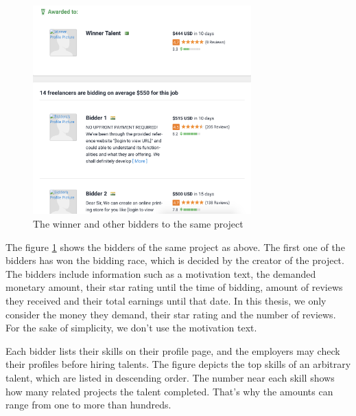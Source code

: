\begin{figure}[!ht]
	\centering
	\includegraphics[width=0.75\textwidth]{figures/FreelancerTalentExample.png}
	\caption{The winner and other bidders to the same project}
	\label{fig:freelancer-example-talent}
\end{figure}


The figure \ref{fig:freelancer-example-talent} shows the bidders of the same project as above. The first one of the bidders has won the bidding race, which is decided by the creator of the project. The bidders include information such as a motivation text, the demanded monetary amount, their star rating until the time of bidding, amount of reviews they received and their total earnings until that date. In this thesis, we only consider the money they demand, their star rating and the number of reviews. For the sake of simplicity, we don't use the motivation text.



Each bidder lists their skills on their profile page, and the employers may check their profiles before hiring talents. The figure depicts the top skills of an arbitrary talent, which are listed in descending order. The number near each skill shows how many related projects the talent completed. That's why the amounts can range from one to more than hundreds. 



